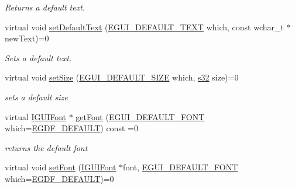 \begin{DoxyCompactItemize}
\begin{DoxyCompactList}\small\item\em Returns a default text. \end{DoxyCompactList}\item 
virtual void \hyperlink{classirr_1_1gui_1_1IGUISkin_a782a67363479b5cf7d085189774908ef}{set\+Default\+Text} (\hyperlink{namespaceirr_1_1gui_a18bc64c635f8b0db66498d779569e296}{E\+G\+U\+I\+\_\+\+D\+E\+F\+A\+U\+L\+T\+\_\+\+T\+E\+XT} which, const wchar\+\_\+t $\ast$new\+Text)=0
\begin{DoxyCompactList}\small\item\em Sets a default text. \end{DoxyCompactList}\item 
\mbox{\label{classirr_1_1gui_1_1IGUISkin_afed39dadcfbdc74138f60a02d7b92d2d}} 
virtual void \hyperlink{classirr_1_1gui_1_1IGUISkin_afed39dadcfbdc74138f60a02d7b92d2d}{set\+Size} (\hyperlink{namespaceirr_1_1gui_a27be6aa12d4985a5005983182fe99d56}{E\+G\+U\+I\+\_\+\+D\+E\+F\+A\+U\+L\+T\+\_\+\+S\+I\+ZE} which, \hyperlink{namespaceirr_ac66849b7a6ed16e30ebede579f9b47c6}{s32} size)=0
\begin{DoxyCompactList}\small\item\em sets a default size \end{DoxyCompactList}\item 
\mbox{\label{classirr_1_1gui_1_1IGUISkin_ab1b2623d04688c4dfe106ca407171d6e}} 
virtual \hyperlink{classirr_1_1gui_1_1IGUIFont}{I\+G\+U\+I\+Font} $\ast$ \hyperlink{classirr_1_1gui_1_1IGUISkin_ab1b2623d04688c4dfe106ca407171d6e}{get\+Font} (\hyperlink{namespaceirr_1_1gui_a9e598ab5e8644d142e55d66e8d308441}{E\+G\+U\+I\+\_\+\+D\+E\+F\+A\+U\+L\+T\+\_\+\+F\+O\+NT} which=\hyperlink{namespaceirr_1_1gui_a9e598ab5e8644d142e55d66e8d308441a0e4ccbc9a50a7d6bf06bc6284d758c2c}{E\+G\+D\+F\+\_\+\+D\+E\+F\+A\+U\+LT}) const =0
\begin{DoxyCompactList}\small\item\em returns the default font \end{DoxyCompactList}\item 
\mbox{\label{classirr_1_1gui_1_1IGUISkin_a1e315ed3175b14294ba753911f8423eb}} 
virtual void \hyperlink{classirr_1_1gui_1_1IGUISkin_a1e315ed3175b14294ba753911f8423eb}{set\+Font} (\hyperlink{classirr_1_1gui_1_1IGUIFont}{I\+G\+U\+I\+Font} $\ast$font, \hyperlink{namespaceirr_1_1gui_a9e598ab5e8644d142e55d66e8d308441}{E\+G\+U\+I\+\_\+\+D\+E\+F\+A\+U\+L\+T\+\_\+\+F\+O\+NT} which=\hyperlink{namespaceirr_1_1gui_a9e598ab5e8644d142e55d66e8d308441a0e4ccbc9a50a7d6bf06bc6284d758c2c}{E\+G\+D\+F\+\_\+\+D\+E\+F\+A\+U\+LT})=0

\end{DoxyCompactItemize}
